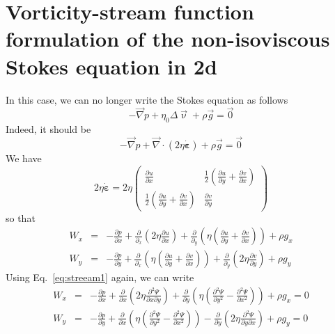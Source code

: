 \section{Vorticity-stream function formulation of the non-isoviscous Stokes equation in 2d}

In this case, we can no longer write the Stokes equation as follows
\begin{equation}
-{\vec \nabla}p + \eta_0 \Delta {\vec \upnu} + \rho {\vec g} = \vec{0}
\end{equation}
Indeed, it should be 
\begin{equation}
-{\vec \nabla}p + \vec\nabla \cdot (2 \eta \dot{\bm \varepsilon}) + \rho {\vec g} = \vec{0}
\end{equation}
We have
\[
2 \eta \dot{\bm \varepsilon}
= 2 \eta 
\left(
\begin{array}{cc}
\frac{\partial u}{\partial x} & \frac12 (\frac{\partial u}{\partial y}+\frac{\partial v}{\partial x}) \\
\frac12 (\frac{\partial u}{\partial y}+\frac{\partial v}{\partial x}) & \frac{\partial v}{\partial y} 
\end{array}
\right)
\]
so that 
\begin{eqnarray}
W_x&=&-\frac{\partial p}{\partial x} 
+ \frac{\partial }{\partial_x} \left(2\eta \frac{\partial u}{\partial x} \right)
+ \frac{\partial }{\partial_y} \left( \eta (\frac{\partial u}{\partial y}+\frac{\partial v}{\partial x}) \right)
+ \rho g_x\\
W_y&=&-\frac{\partial p}{\partial y} 
+ \frac{\partial }{\partial_x} \left( \eta (\frac{\partial u}{\partial y}+\frac{\partial v}
{\partial x}) \right) 
+ \frac{\partial }{\partial_y} \left(2\eta \frac{\partial v}{\partial y} \right)
+ \rho g_y
\end{eqnarray}
Using Eq.~\eqref{eq:streeam1} again, we can write 
\begin{eqnarray}
W_x&=&-\frac{\partial p}{\partial x} 
+ \frac{\partial }{\partial x} \left(2\eta \frac{\partial^2 \Psi}{\partial x \partial y} \right)
+ \frac{\partial }{\partial y} \left( \eta (\frac{\partial^2 \Psi}{\partial y^2}-\frac{\partial^2 \Psi}{\partial x^2}) \right)
+ \rho g_x = 0\\
W_y&=&-\frac{\partial p}{\partial y} 
+ \frac{\partial }{\partial x} \left( \eta (\frac{\partial^2 \Psi}{\partial y^2}-\frac{\partial^2 \Psi}{\partial x^2}) \right) 
- \frac{\partial }{\partial y} \left(2\eta \frac{\partial^2 \Psi}{\partial y \partial x} \right)
+ \rho g_y = 0
\end{eqnarray}
